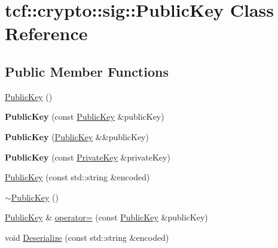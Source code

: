 \hypertarget{classtcf_1_1crypto_1_1sig_1_1PublicKey}{}\section{tcf\+:\+:crypto\+:\+:sig\+:\+:Public\+Key Class Reference}
\label{classtcf_1_1crypto_1_1sig_1_1PublicKey}
\subsection*{Public Member Functions}
\begin{DoxyCompactItemize}
\item 
\hyperlink{classtcf_1_1crypto_1_1sig_1_1PublicKey_aa337e4675d5831cd3a553d168b268430}{Public\+Key} ()
\item 
\mbox{\label{classtcf_1_1crypto_1_1sig_1_1PublicKey_ad62b675919bd9703572dfc4809f48d32}} 
{\bfseries Public\+Key} (const \hyperlink{classtcf_1_1crypto_1_1sig_1_1PublicKey}{Public\+Key} \&public\+Key)
\item 
\mbox{\label{classtcf_1_1crypto_1_1sig_1_1PublicKey_a37f0b346f25e153e0939c715371b6812}} 
{\bfseries Public\+Key} (\hyperlink{classtcf_1_1crypto_1_1sig_1_1PublicKey}{Public\+Key} \&\&public\+Key)
\item 
\mbox{\label{classtcf_1_1crypto_1_1sig_1_1PublicKey_a4c00d9da275f247ae29c21a09c98989d}} 
{\bfseries Public\+Key} (const \hyperlink{classtcf_1_1crypto_1_1sig_1_1PrivateKey}{Private\+Key} \&private\+Key)
\item 
\hyperlink{classtcf_1_1crypto_1_1sig_1_1PublicKey_aacb62a84346f7f055d1aed9f1a4209f5}{Public\+Key} (const std\+::string \&encoded)
\item 
\hyperlink{classtcf_1_1crypto_1_1sig_1_1PublicKey_a3d8af075952ecc7e33757a6b772c87e1}{$\sim$\+Public\+Key} ()
\item 
\hyperlink{classtcf_1_1crypto_1_1sig_1_1PublicKey}{Public\+Key} \& \hyperlink{classtcf_1_1crypto_1_1sig_1_1PublicKey_ae15e7b3fa28aade46e8fa7eed54516e3}{operator=} (const \hyperlink{classtcf_1_1crypto_1_1sig_1_1PublicKey}{Public\+Key} \&public\+Key)
\item 
void \hyperlink{classtcf_1_1crypto_1_1sig_1_1PublicKey_a3d4cdf4a14a8815bd97d924a19320d07}{Deserialize} (const std\+::string \&encoded)

\end{DoxyCompactItemize}
